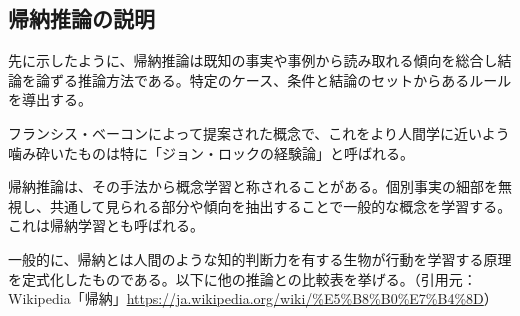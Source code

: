 \documentclass[dvipdfmx]{jsarticle}
\begin{document}
\subsection{帰納推論の説明}
先に示したように、帰納推論は既知の事実や事例から読み取れる傾向を総合し結論を論ずる推論方法である。特定のケース、条件と結論のセットからあるルールを導出する。\par
フランシス・ベーコンによって提案された概念で、これをより人間学に近いよう噛み砕いたものは特に「ジョン・ロックの経験論」と呼ばれる。\par
帰納推論は、その手法から概念学習と称されることがある。個別事実の細部を無視し、共通して見られる部分や傾向を抽出することで一般的な概念を学習する。これは帰納学習とも呼ばれる。\par
一般的に、帰納とは人間のような知的判断力を有する生物が行動を学習する原理を定式化したものである。以下に他の推論との比較表を挙げる。（引用元：Wikipedia「帰納」\url{https://ja.wikipedia.org/wiki/%E5%B8%B0%E7%B4%8D}）
\begin{table}[H]
\caption{推論手法の比較}
\end{table}
\end{document}
